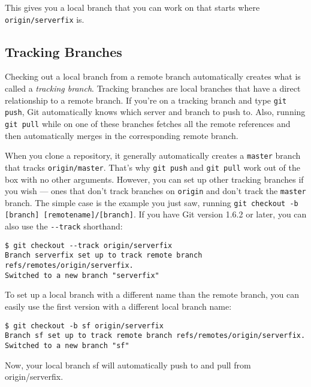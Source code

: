 \documentclass[a4paper]{book}
\begin{document}
This gives you a local branch that you can work on that starts where \texttt{origin/serverfix} is.

\subsection{Tracking Branches}

Checking out a local branch from a remote branch automatically creates what is called a \emph{tracking branch}. Tracking branches are local branches that have a direct relationship to a remote branch. If you're on a tracking branch and type \texttt{git push}, Git automatically knows which server and branch to push to. Also, running \texttt{git pull} while on one of these branches fetches all the remote references and then automatically merges in the corresponding remote branch.

When you clone a repository, it generally automatically creates a \texttt{master} branch that tracks \texttt{origin/master}. That's why \texttt{git push} and \texttt{git pull} work out of the box with no other arguments. However, you can set up other tracking branches if you wish --- ones that don't track branches on \texttt{origin} and don't track the \texttt{master} branch. The simple case is the example you just saw, running \texttt{git checkout -b {[}branch{]} {[}remotename{]}/{[}branch{]}}. If you have Git version 1.6.2 or later, you can also use the \texttt{-{}-track} shorthand:

\begin{shaded}\begin{verbatim}
$ git checkout --track origin/serverfix
Branch serverfix set up to track remote branch refs/remotes/origin/serverfix.
Switched to a new branch "serverfix"
\end{verbatim}\end{shaded}

To set up a local branch with a different name than the remote branch, you can easily use the first version with a different local branch name:

\begin{shaded}\begin{verbatim}
$ git checkout -b sf origin/serverfix
Branch sf set up to track remote branch refs/remotes/origin/serverfix.
Switched to a new branch "sf"
\end{verbatim}\end{shaded}

Now, your local branch sf will automatically push to and pull from origin/serverfix.
\end{document}
